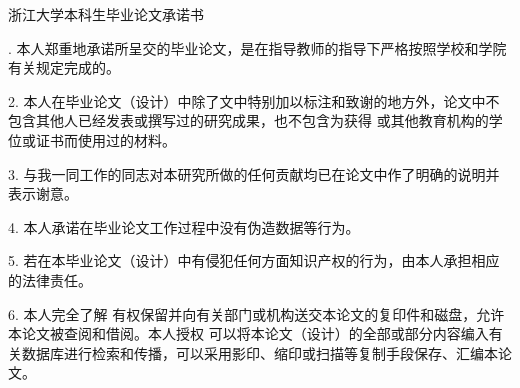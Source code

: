 {
  \setlength{\parindent}{0em}
  \linespread{1}

  \vspace*{0.6em}

  {
    \centering
    \fangsong\sanhao
    浙江大学本科生毕业论文承诺书 \par
  }

  \vspace{3.1em}

  {
    \setlength{\parindent}{2em}
    \linespread{1.6}
    \fangsong{}. 本人郑重地承诺所呈交的毕业论文，是在指导教师的指导下严格按照学校和学院有关规定完成的。
    
    2. 本人在毕业论文（设计）中除了文中特别加以标注和致谢的地方外，论文中不包含其他人已经发表或撰写过的研究成果，也不包含为获得 \underline{\fangsong\sihao\bfseries {}} 或其他教育机构的学位或证书而使用过的材料。
    
    3. 与我一同工作的同志对本研究所做的任何贡献均已在论文中作了明确的说明并表示谢意。
    
    4. 本人承诺在毕业论文工作过程中没有伪造数据等行为。
    
    5. 若在本毕业论文（设计）中有侵犯任何方面知识产权的行为，由本人承担相应的法律责任。
    
    6. 本人完全了解 \underline{\fangsong\sihao\bfseries {}} 有权保留并向有关部门或机构送交本论文的复印件和磁盘，允许本论文被查阅和借阅。本人授权 \underline{\fangsong\sihao\bfseries {}} 可以将本论文（设计）的全部或部分内容编入有关数据库进行检索和传播，可以采用影印、缩印或扫描等复制手段保存、汇编本论文。
     \par
  }

  \vspace{2.9em}

}

